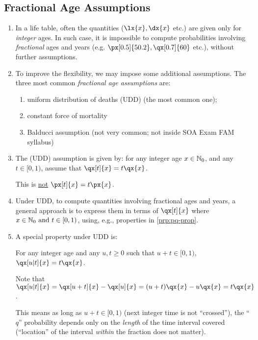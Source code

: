 \subsection{Fractional Age Assumptions}
\begin{enumerate}
\item In a life table, often the quantities (\(\lx{x},\dx{x}\) etc.) are given
only for \emph{integer} ages. In such case, it is impossible to compute probabilities
involving \emph{fractional} ages and years (e.g. \(\px[0.5]{50.2},
\qx[0.7]{60}\) etc.), without further assumptions.
\item To improve the flexibility, we may impose some additional assumptions.
The three most common \emph{fractional age assumptions} are: \begin{enumerate}
\item uniform distribution of deaths (UDD) (the most common one);
\item constant force of mortality
\item Balducci assumption (not very common; not inside SOA Exam FAM syllabus)
\end{enumerate}

\item The  (UDD) assumption is given by: for
any integer age \(x\in\mathbb{N}_0\), and any \(t\in[0,1)\), assume that
\(\qx[t]{x}=t\qx{x}\).
\begin{warning}
This is \underline{not} \(\px[t]{x}=t\px{x}\).
\end{warning}
\item \label{it:udd-approach} Under UDD, to compute quantities involving fractional ages and years,
a general approach is to express them in terms of \(\qx[t]{x}\) where
\(x\in\mathbb{N}_0\text{ and }t\in[0,1)\), using, e.g., properties in \cref{prp:pq-prop}.
\item A special property under UDD is:
\begin{proposition}
For any integer age and any \(u,t\ge 0\) such that \(u+t\in[0,1)\),
\(\qx[u|t]{x}=t\qx{x}\).
\end{proposition}

\begin{pf}
Note that \(\qx[u|t]{x}=\qx[u+t]{x}-\qx[u]{x}=(u+t)\qx{x}-u\qx{x}=t\qx{x}\).
\end{pf}

\begin{note}
This means as long as \(u+t\in[0,1)\) (next integer time is not ``crossed''),
the ``\(q\)'' probability depends only on the \emph{length} of the time interval
covered (``location'' of the interval \emph{within} the fraction does not
matter).
\end{note}


\end{enumerate}
